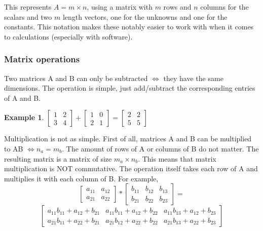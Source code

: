 \documentclass{article}
\newtheorem{example}{Example}
\begin{document}
This represents $A=m\times n$, using a matrix with $m$ rows and $n$ columns for the scalars and two $m$ length vectors, one for the unknowns and one for the
constants. This notation makes these notably easier to work with when it comes to calculations (especially with software). 

\subsubsection{Matrix operations}
Two matrices A and B can only be subtracted $\iff$ they have the same dimensions. The operation is simple, just add/subtract the corresponding entries of A and B.
\begin{example} $\begin{bmatrix} 1 & 2 \\ 3 & 4 \end{bmatrix} + \begin{bmatrix} 1 & 0 \\ 2 & 1 \end{bmatrix} = \begin{bmatrix} 2 & 2 \\ 5 & 5 \end{bmatrix}$
\end{example}

Multiplication is not as simple. First of all, matrices A and B can be multiplied to AB $\iff n_a=m_b$. The amount of rows of A or columns of B do not matter.
The resulting matrix is a matrix of size $m_a\times n_b$. This means that matrix multiplication is NOT commutative. The operation itself takes each row of A
and multiplies it with each column of B. For example,
$$\begin{bmatrix}a_{11} & a_{12} \\ a_{21} & a_{22} \end{bmatrix} * \begin{bmatrix}b_{11} & b_{12} & b_{13} \\ b_{21} & b_{22} & b_{23}\end{bmatrix}=$$
$$
\begin{bmatrix}
a_{11}b_{11}+a_{12}+b_{21} & a_{11}b_{11}+a_{12}+b_{22} & a_{11}b_{13}+a_{12}+b_{23} \\ 
a_{21}b_{11}+a_{22}+b_{21} & a_{21}b_{12}+a_{22}+b_{22} & a_{21}b_{13}+a_{22}+b_{23}
\end{bmatrix}$$
\end{document}
